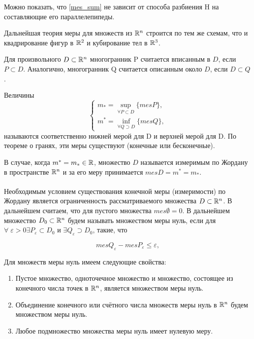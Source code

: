 \documentclass[../../main.tex]{subfiles}
\begin{document}
Можно показать, что \eqref{mes_sum} не зависит от способа разбиения H 
на составляющие его параллелепипеды.

Дальнейшая теория меры для множеств из $\mathbb{R}^n$ строится по тем же
схемам, что и квадрирование фигур в $\mathbb{R}^2$ и кубирование тел в $\mathbb{R}^3$.

Для произвольного $D \subset \mathbb{R}^n$ многогранник P считается вписанным в $D$, 
если $P \subset D$. Аналогично, многогранник Q 
считается  описанным около $D$, если $D \subset Q$.

Величины
\begin{equation}
\begin{cases}
m_* = \underset{\forall P \subset D}{\sup} \{ mesP \}, \\
m^* = \underset{\forall Q \supset D}{\inf} \{ mesQ \},
\end{cases}
\end{equation}
называются соответственно нижней мерой для D и верхней мерой для D.
По теореме о гранях, эти меры существуют (конечные или бесконечные).

В случае, когда $ m^* = m_{*} \in \mathbb{R} $,
множество $ D $ называется измеримым по Жордану в пространстве $\mathbb{R}^n$ 
и за его меру принимается $mesD = m^* = m_{*}$.
\\\\
Необходимым условием существования конечной меры (измеримости) по Жордану 
является ограниченность рассматриваемого множества $D \subset \mathbb{R}^n$. 
В дальнейшем считаем, что для пустого множества $mes\emptyset = 0$.
В дальнейшем множество $D_0 \subset \mathbb{R}^n$ будем называть множеством меры нуль, 
если для $\forall\; \varepsilon > 0 \exists P_\varepsilon \subset D_0$ 
и $\exists Q_\varepsilon \supset D_0$, такие, что

\begin{equation}
\label{614}
mesQ_\varepsilon - mesP_\varepsilon \le \varepsilon,
\end{equation}

Для множеств меры нуль имеем следующие свойства:
\begin{enumerate}
	\item Пустое множество, одноточечное множество и множество, 
	состоящее из конечного числа точек в $\mathbb{R}^n$, является множеством меры нуль.
	\item Объединение конечного или счётного числа множеств меры нуль 
	в $\mathbb{R}^n$ будем множеством меры нуль.
	\item Любое подмножество множества меры нуль имеет нулевую меру.
\end{enumerate}
\end{document}
